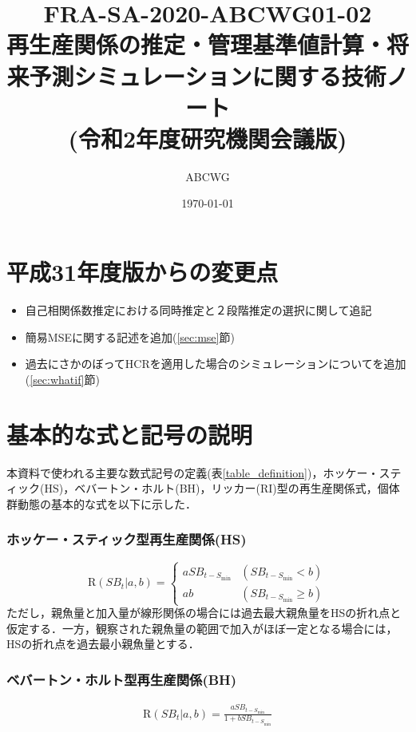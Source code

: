 \documentclass[11pt]{jsarticle}
\begin{document}
\title{{\normalsize FRA-SA-2020-ABCWG01-02}\\
  再生産関係の推定・管理基準値計算・将来予測シミュレーションに関する技術ノート \\
  \Large (令和2年度研究機関会議版)
}
\author{ABCWG}
\date{\today}
\maketitle

\section{平成31年度版からの変更点}
\begin{itemize}
\item 自己相関係数推定における同時推定と２段階推定の選択に関して追記
\item 簡易MSEに関する記述を追加(\ref{sec:mse}節)  
\item 過去にさかのぼってHCRを適用した場合のシミュレーションについてを追加(\ref{sec:whatif}節)
\end{itemize}

\section{基本的な式と記号の説明}
本資料で使われる主要な数式記号の定義(表\ref{table_definition})，ホッケー・スティック(HS)\cite{hockey}，ベバートン・ホルト(BH)\cite{beverton}，リッカー(RI)\cite{ricker}型の再生産関係式，個体群動態の基本的な式を以下に示した． 

\subsubsection*{ホッケー・スティック型再生産関係(HS)}
\begin{equation}
  \mathrm{R}(S\!B_{t}|a,b)=\begin{cases}
    a  S\!B_{t-S_{\mathrm{min}}} & (S\!B_{t-S_{\mathrm{min}}} < b) \\
    a  b                 & (S\!B_{t-S_{\mathrm{min}}} \geq b)
  \end{cases}
  \label{HS}
\end{equation}
ただし，親魚量と加入量が線形関係の場合には過去最大親魚量をHSの折れ点と仮定する．一方，観察された親魚量の範囲で加入がほぼ一定となる場合には，HSの折れ点を過去最小親魚量とする．

\subsubsection*{ベバートン・ホルト型再生産関係(BH)}
\begin{eqnarray}
  \mathrm{R}(S\!B_{t}|a,b)=\frac{a S\!B_{t-S_{\mathrm{min}}}}{1 + b S\!B_{t-S_{\mathrm{min}}}}
  \label{BH1}
\end{eqnarray}
\end{document}
